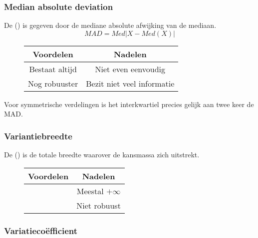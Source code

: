 \documentclass[main.tex]{subfiles}
\begin{document}
\subsubsection{Median absolute deviation}
\label{sec:medi-absol-devi}

\begin{de}
  De  () is gegeven door de mediane absolute afwijking van de mediaan.
  \[ MAD = Med|X - Med(X)| \]
\end{de}

\begin{figure}[H]
  \centering
  \begin{tabular}{|c|c|}
    \hline
    Voordelen & Nadelen\\
    \hline \hline
    Bestaat altijd & Niet even eenvoudig\\
    Nog robuuster & Bezit niet veel informatie\\
    \hline
  \end{tabular}
\end{figure}

\begin{st}
  Voor symmetrische verdelingen is het interkwartiel precies gelijk aan twee keer de MAD.
\end{st}

\subsubsection{Variantiebreedte}
\label{sec:variantiebreedte}

\begin{de}
  De  () is de totale breedte waarover de kansmassa zich uitstrekt.
\end{de}

\begin{figure}[H]
  \centering
  \begin{tabular}{|c|c|}
    \hline
    Voordelen & Nadelen\\
    \hline \hline
    & Meestal $+\infty$ \\
    & Niet robuust\\
    \hline
  \end{tabular}
\end{figure}

\subsubsection{Variatieco\"efficient}
\label{sec:variatiecoefficient}
\end{document}
